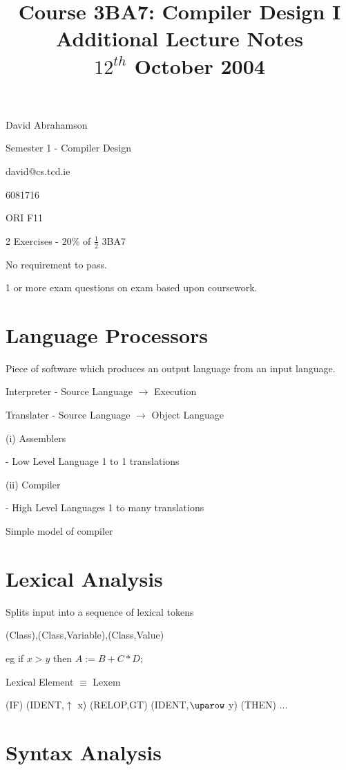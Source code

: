 \documentclass[a4paper,12pt]{article}
\begin{document}
\title{Course 3BA7: Compiler Design I \\ Additional Lecture Notes \\ $12^{th}$ October 2004}

\maketitle

David Abrahamson

Semester 1 - Compiler Design

david@cs.tcd.ie

6081716

ORI F11

2 Exercises - $20\%$ of $\frac{1}{2}$ 3BA7

No requirement to pass.

1 or more exam questions on exam based upon coursework.


\section{Language Processors}

Piece of software which produces an output language from an input
language.


Interpreter - Source Language $\to$ Execution

Translater -  Source Language $\to$ Object Language

(i) Assemblers
	
	- Low Level Language
	  1 to 1 translations

(ii) Compiler
	
	- High Level Languages
	  1 to many translations



Simple model of compiler

\section{Lexical Analysis}

Splits input into a sequence of lexical tokens

(Class),(Class,Variable),(Class,Value)


eg
	if $x \gt y$ then
		$A := B + C * D;$

Lexical Element $\equiv$ Lexem

(IF) (IDENT,$\uparrow$ x) (RELOP,GT) (IDENT,$\uparow$ y) (THEN) ...

\section{Syntax Analysis}
\end{document}
